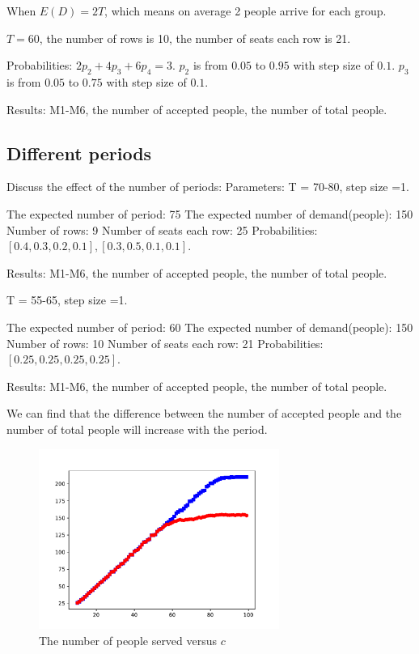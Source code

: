 % 

When $E(D) = 2T$, which means on average 2 people arrive for each group.

$T = 60$, the number of rows is 10, the number of seats each row is 21.

Probabilities: 
$2p_2 + 4p_3 + 6p_4 =3$. $p_2$ is from $0.05$ to $0.95$ with step size of $0.1$. $p_3$ is from $0.05$ to $0.75$ with step size of $0.1$.

Results: M1-M6, the number of accepted people, the number of total people.

% 

\subsection{Different periods}
Discuss the effect of the number of periods: 
Parameters: T = 70-80, step size =1.

The expected number of period: 75
The expected number of demand(people): 150
Number of rows: 9
Number of seats each row: 25
Probabilities: $[0.4, 0.3, 0.2, 0.1], [0.3, 0.5, 0.1, 0.1]$.

Results: M1-M6, the number of accepted people, the number of total people.

% 

% 

T = 55-65, step size =1.

The expected number of period: 60
The expected number of demand(people): 150
Number of rows: 10
Number of seats each row: 21
Probabilities: $[0.25, 0.25, 0.25, 0.25]$.

Results: M1-M6, the number of accepted people, the number of total people.

We can find that the difference between the number of accepted people and the number of total people will increase with the period. 

\begin{figure}[ht]
  \centering
  \includegraphics[width = 0.7\textwidth]{./Figures/Figure_111.pdf}
  \caption{The number of people served versus $c$}
\end{figure}

